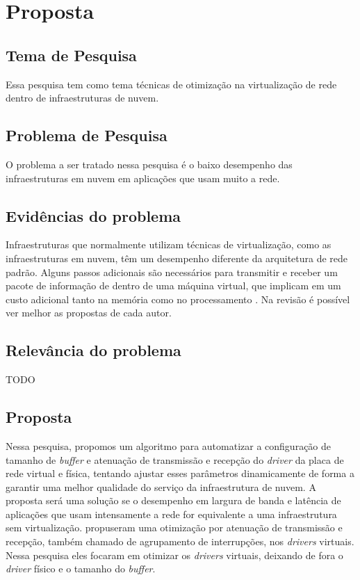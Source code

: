 \chapter{Proposta}
\label{cap:proposta}

\section{Tema de Pesquisa}
Essa pesquisa tem como tema técnicas de otimização na virtualização de rede dentro de infraestruturas de nuvem.

\section{Problema de Pesquisa}
O problema a ser tratado nessa pesquisa é o baixo desempenho das infraestruturas em nuvem em aplicações que usam muito a rede.

\section{Evidências do problema}
Infraestruturas que normalmente utilizam técnicas de virtualização, como as infraestruturas em nuvem, têm um desempenho diferente da arquitetura de rede padrão. Alguns passos adicionais são necessários para transmitir e receber um pacote de informação de dentro de uma máquina virtual, que implicam em um custo adicional tanto na memória como no processamento \cite{chaudhary2008comparison} \cite{ekanayake2010high} \cite{liu2010evaluating} \cite{Waldspurger:2012:IV:2063176.2063194} \cite{Rixner:2008:NVB:1348583.1348592}. Na revisão é possível ver melhor as propostas de cada autor.


\section{Relevância do problema}
TODO

\section{Proposta}
    Nessa pesquisa, propomos um algoritmo para automatizar a configuração de tamanho de \textit{buffer} e atenuação de transmissão e recepção do \textit{driver} da placa de rede virtual e física, tentando ajustar esses parâmetros dinamicamente de forma a garantir uma melhor qualidade do serviço da infraestrutura de nuvem. 
A proposta será uma solução se o desempenho em largura de banda e latência de aplicações que usam intensamente a rede for equivalente a uma infraestrutura sem virtualização.
    \cite{dong2011optimizing} propuseram uma otimização por atenuação de transmissão e recepção, também chamado de agrupamento de interrupções, nos \textit{drivers} virtuais. Nessa pesquisa eles focaram em otimizar os \textit{drivers} virtuais, deixando de fora o \textit{driver} físico e o tamanho do \textit{buffer}.


